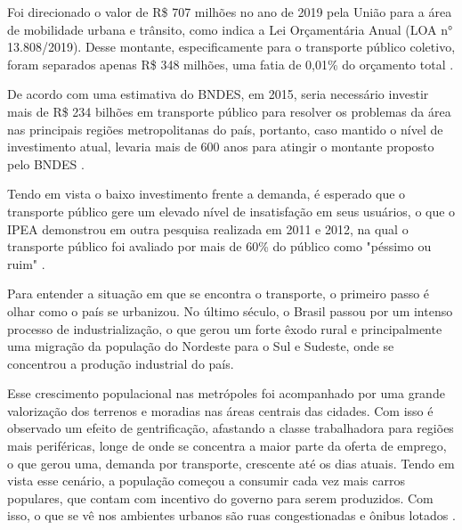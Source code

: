 \begin{comment}
    \section{Panorama econômico}

\indent
\end{comment}
\par Foi direcionado o valor de R\$ 707 milhões no ano de 2019 pela União para a área de mobilidade urbana e trânsito, como indica a Lei Orçamentária Anual (LOA n° 13.808/2019). Desse montante, especificamente para o transporte público coletivo, foram separados apenas R\$ 348 milhões, uma fatia de 0,01\% do orçamento total \cite{NTUrbano}.
\par De acordo com uma estimativa do BNDES, em 2015, seria necessário investir mais de R\$ 234 bilhões em transporte público para resolver os problemas da área nas principais regiões metropolitanas do país, portanto, caso mantido o nível de investimento atual, levaria mais de 600 anos para atingir o montante proposto pelo BNDES \cite{Santos2015}.
\begin{comment}
\section{Definição do problema}

\indent
\end{comment}
\par Tendo em vista o baixo investimento frente a demanda, é esperado que o transporte público gere um elevado nível de insatisfação em seus usuários, o que o IPEA demonstrou em outra pesquisa realizada em 2011 e 2012, na qual o transporte público foi avaliado por mais de 60\% do público como "péssimo ou ruim"  \cite{Santos2015}.
\par Para entender a situação em que se encontra o transporte, o primeiro passo é olhar como o país se urbanizou. No último século, o Brasil passou por um intenso processo de industrialização, o que gerou um forte êxodo rural e principalmente uma migração da população do Nordeste para o Sul e Sudeste, onde se concentrou a produção industrial do país.
\par Esse crescimento populacional nas metrópoles foi acompanhado por uma grande valorização dos terrenos e moradias nas áreas centrais das cidades. Com isso é observado um efeito de gentrificação, afastando a classe trabalhadora para regiões mais periféricas, longe de onde se concentra a maior parte da oferta de emprego, o que gerou uma, demanda por transporte, crescente até os dias atuais.
Tendo em vista esse cenário, a população começou a consumir cada vez mais carros populares, que contam com incentivo do governo para serem produzidos. Com isso, o que se vê nos ambientes urbanos são ruas congestionadas e ônibus lotados \cite{PenaSD}.


